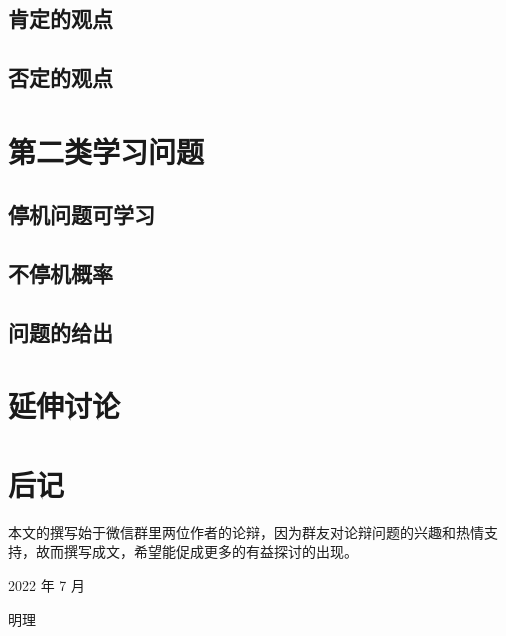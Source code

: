 \documentclass[a4paper,12pt]{article}
\numberwithin{problem}{section}
\numberwithin{definition}{section}
\numberwithin{lemma}{section}
\numberwithin{proposition}{section}
\numberwithin{theorem}{section}
\numberwithin{grammar}{section}
\numberwithin{program}{section}
\numberwithin{convention}{section}
\numberwithin{corollary}{section}
\begin{document}
\subsection{肯定的观点}

\subsection{否定的观点}
\newpage

\section{第二类学习问题}

\subsection{停机问题可学习}

\subsection{不停机概率}

\subsection{问题的给出}

\section{延伸讨论}
\newpage

{}



\newpage
{}
{}
\printindex
\printglossaries

\newpage
\section{后记}
\label{section:postscript}

本文的撰写始于微信群里两位作者的论辩，因为群友对论辩问题的兴趣和热情支持，故而撰写成文，希望能促成更多的有益探讨的出现。

\hfill \hfill 2022 年 7 月

\hfill \hfill 明理
\end{document}
